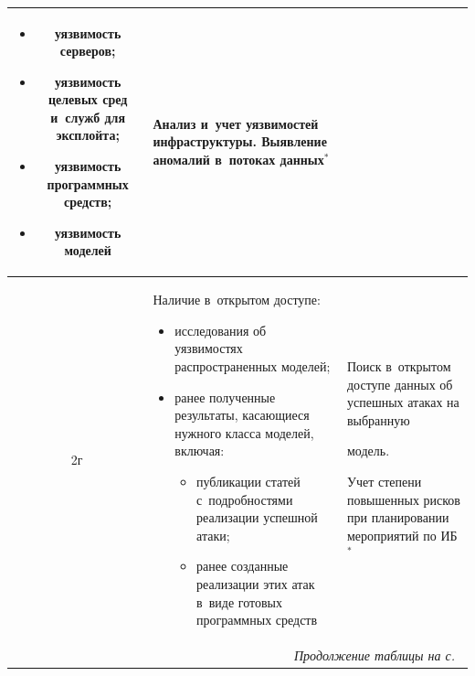 \begin{table}
\begin{center}
\begin{tabular}{|c|p{66mm}|p{50mm}|}
\begin{itemize}
\addtolength{\itemsep}{-6pt}

\item уязвимость серверов;

\item уязвимость целевых сред и~служб для эксплойта;

\item уязвимость программных средств;

\item уязвимость моделей\vspace*{-6pt}

\end{itemize}&Анализ и~учет уязвимостей инфраструктуры. Выявление аномалий в~потоках данных$^{*}$\\

\hline

2г&Наличие в~открытом доступе:\vspace*{-6pt}

\begin{itemize}

\addtolength{\itemsep}{-6pt}

\item исследования об уязвимостях распространенных моделей;

\item ранее полученные результаты, касающиеся нужного класса моделей, включая:\vspace*{-6pt}

\begin{itemize}

\addtolength{\itemsep}{-6pt}

\item публикации статей с~подробностями реализации успешной атаки;

\item ранее созданные реализации этих атак в~виде готовых программных средств\vspace*{-6pt}

\end{itemize}

\end{itemize}&Поиск в~открытом доступе данных об успешных атаках на выбранную 

модель.\newline

Учет степени повышенных рисков при планировании мероприятий по ИБ$^{*}$\\

\hline

\multicolumn{3}{r}{\textit{Продолжение таблицы на с.}~\pageref{s1}}

\end{tabular}

\end{center}

\end{table}





